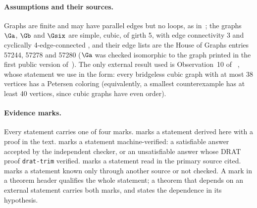 \paragraph{Assumptions and their sources.} Graphs are finite and may have parallel edges but no loops, as in~\cite{MMSW2025};
the graphs $\Ga$, $\Gb$ and $\Gsix$ are simple, cubic, of girth 5, with edge connectivity 3 and cyclically 4-edge-connected
\evMV{}, and their edge lists are the House of Graphs entries 57244, 57278 and 57280 ($\Ga$ was checked isomorphic to the graph
printed in the first public version of~\cite{GJMMM2026zenodo}). The only external result used is Observation~10
of~\cite{GJMMMU2026} \evV{}, whose statement we use in the form: every bridgeless cubic graph with at most 38 vertices
has a Petersen coloring (equivalently, a smallest counterexample has at least 40 vertices, since cubic graphs have even order).

\paragraph{Evidence marks.} Every statement carries one of four marks. \evD{} marks a statement derived here with a proof in
the text. \evMV{} marks a statement machine-verified: a satisfiable answer accepted by the independent checker, or an unsatisfiable
answer whose DRAT proof \texttt{drat-trim} verified. \evV{} marks a statement read in the primary source cited. \evU{} marks a
statement known only through another source or not checked. A mark in a theorem header qualifies the whole statement; a theorem
that depends on an external statement carries both marks, and states the dependence in its hypothesis.

